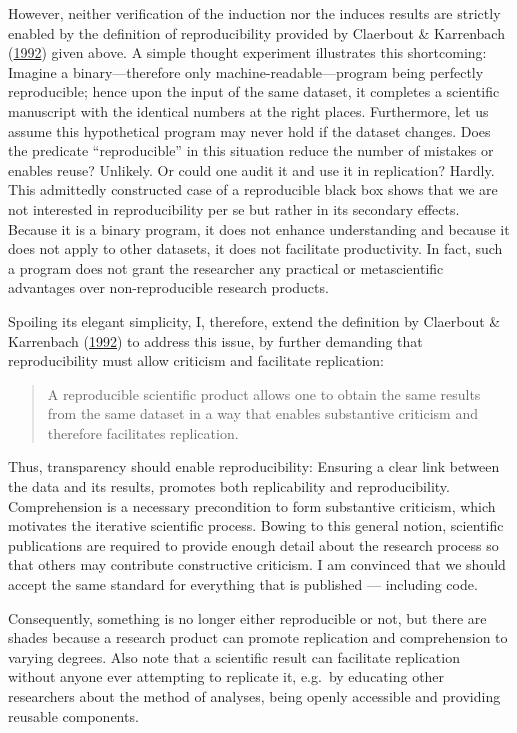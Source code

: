 \documentclass[12pt,a4paper,twoside]{article}
\begin{document}
However, neither verification of the induction nor the induces results are strictly enabled by the definition of reproducibility provided by Claerbout \& Karrenbach (\protect\hyperlink{ref-claerboutElectronicDocumentsGive1992}{1992}) given above.
A simple thought experiment illustrates this shortcoming:
Imagine a binary---therefore only machine-readable---program being perfectly reproducible; hence upon the input of the same dataset, it completes a scientific manuscript with the identical numbers at the right places.
Furthermore, let us assume this hypothetical program may never hold if the dataset changes.
Does the predicate ``reproducible'' in this situation reduce the number of mistakes or enables reuse? Unlikely.
Or could one audit it and use it in replication? Hardly.
This admittedly constructed case of a reproducible black box shows that we are not interested in reproducibility per se but rather in its secondary effects.
Because it is a binary program, it does not enhance understanding and because it does not apply to other datasets, it does not facilitate productivity.
In fact, such a program does not grant the researcher any practical or metascientific advantages over non-reproducible research products.

Spoiling its elegant simplicity, I, therefore, extend the definition by Claerbout \& Karrenbach (\protect\hyperlink{ref-claerboutElectronicDocumentsGive1992}{1992}) to address this issue, by further demanding that reproducibility must allow criticism and facilitate replication:

\begin{quote}
A reproducible scientific product allows one to obtain the same results from the same dataset in a way that enables substantive criticism and therefore facilitates replication.
\end{quote}

Thus, transparency should enable reproducibility: Ensuring a clear link between the data and its results, promotes both replicability and reproducibility.
Comprehension is a necessary precondition to form substantive criticism, which motivates the iterative scientific process.
Bowing to this general notion, scientific publications are required to provide enough detail about the research process so that others may contribute constructive criticism.
I am convinced that we should accept the same standard for everything that is published --- including code.

Consequently, something is no longer either reproducible or not, but there are shades because a research product can promote replication and comprehension to varying degrees.
Also note that a scientific result can facilitate replication without anyone ever attempting to replicate it, e.g.~by educating other researchers about the method of analyses, being openly accessible and providing reusable components.
\end{document}
